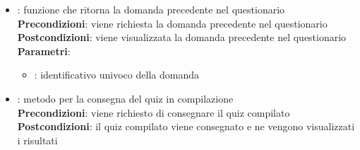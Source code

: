 \begin{itemize}
\begin{itemize}
		\item{}: funzione che ritorna la domanda precedente nel questionario\\
		\textbf{Precondizioni}: viene richiesta la domanda precedente nel questionario\\
		\textbf{Postcondizioni}: viene visualizzata la domanda precedente nel questionario\\
		\textbf{Parametri}:
			\begin{itemize}
				\item{}: identificativo univoco della domanda\\
			\end{itemize}
		\item{}: metodo per la consegna del quiz in compilazione\\
		\textbf{Precondizioni}: viene richiesto di consegnare il quiz compilato\\
		\textbf{Postcondizioni}: il quiz compilato viene consegnato e ne vengono visualizzati i risultati\\
	\end{itemize}
\end{itemize}

